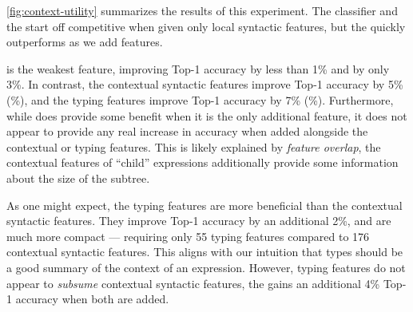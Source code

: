 %
\autoref{fig:context-utility} summarizes the results of this experiment.
%
The \linear classifier and the \hiddenFH start off
competitive when given only local syntactic features, but the \hiddenFH
quickly outperforms as we add features.

\ExprSize is the weakest feature, improving \linear Top-1
accuracy by less than 1\% and \hiddenFH by only 3\%.
%
In contrast, the contextual syntactic features improve \linear Top-1
accuracy by 5\% (\%), and the typing features improve
Top-1 accuracy by 7\% (\%).
%
Furthermore, while \ExprSize does provide some benefit when it is the
only additional feature, it does not appear to provide any real increase
in accuracy when added alongside the contextual or typing features.
%
This is likely explained by \emph{feature overlap}, \ie the contextual
features of ``child'' expressions additionally provide some information
about the size of the subtree.

As one might expect, the typing features are more beneficial than the
contextual syntactic features.
%
They improve Top-1 accuracy by an additional 2\%, and are much more
compact --- requiring only 55 typing features compared to 176
contextual syntactic features.
%
This aligns with our intuition that types should be a good summary of
the context of an expression.
%
However, typing features do not appear to \emph{subsume} contextual
syntactic features, the \hiddenFH gains an additional 4\% Top-1 accuracy
when both are added.
